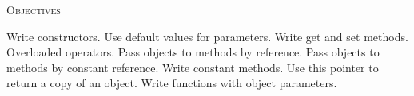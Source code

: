 \textsc{Objectives}
    \begin{tightlist}
    \li    Write constructors.
    \li    Use default values for parameters.
    \li    Write get and set methods.
    \li    Overloaded operators.
    \li    Pass objects to methods by reference.
    \li    Pass objects to methods by constant reference.
    \li    Write constant methods.
    \li    Use this pointer to return a copy of an object.
    \li    Write functions with object parameters.
    \end{tightlist}
